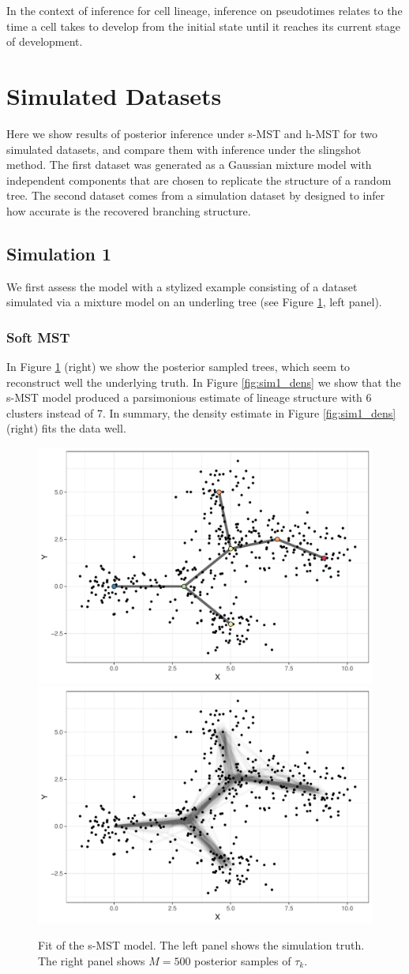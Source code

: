In the context of inference for cell lineage, inference on pseudotimes
relates to the time a cell takes to develop
from the initial state until it reaches its current stage of development.


\section{Simulated Datasets}

Here we show results of posterior inference under s-MST and h-MST for two simulated datasets, and compare them with inference under the slingshot method. The first dataset was generated as a Gaussian mixture model with independent components that are chosen to replicate the structure of a random tree. The second dataset comes from a simulation dataset by \cite{street2018} designed to infer how accurate is the recovered branching structure. 

\subsection{Simulation 1}

We first  assess the model with a stylized  example
consisting of a dataset simulated via a mixture model on an underling
tree (see Figure \ref{fig:sim1_tree}, left panel). 

\subsubsection*{Soft MST}

 In Figure \ref{fig:sim1_tree} (right) we show the posterior sampled trees, which seem to reconstruct well the underlying truth.  In Figure
\ref{fig:sim1_dens} we show that the s-MST model produced a parsimonious estimate of lineage structure with 6 clusters instead of 7. In summary, the density estimate in Figure \ref{fig:sim1_dens} (right) fits the data well.


\begin{figure}[!ht]
  \centering
  \includegraphics[width=.33\linewidth]{Img/Simulated/true}
    \includegraphics[width=.33\linewidth]{Img/Simulated/posterior_trees}
\caption{Fit of the s-MST model. The left panel shows the simulation
  truth. The right panel shows $M=500$ posterior samples of $\tau_k$.}
\label{fig:sim1_tree}
\end{figure}


